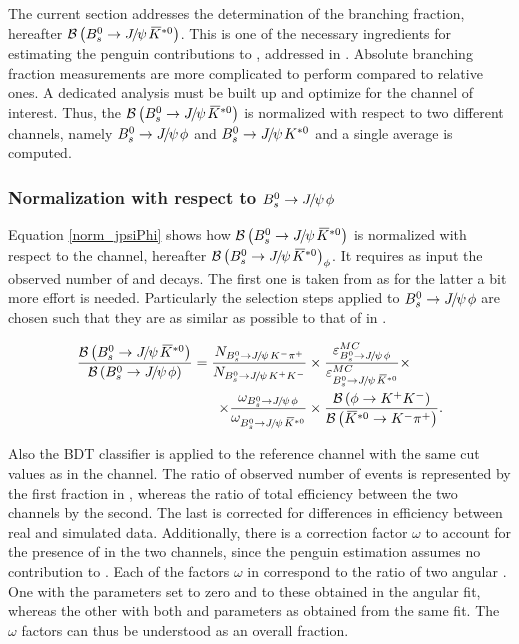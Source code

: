 
The current section addresses the determination of the \BsJpsiKst branching fraction, hereafter $\BRof\BsJpsiKst$.
This is one of the necessary ingredients for estimating the penguin contributions to \phis, addressed in .
Absolute branching fraction measurements are more complicated to perform compared to relative ones. A dedicated analysis
must be built up and optimize for the channel of interest. Thus, the $\BRof\BsJpsiKst$ is normalized with respect
to two different channels, namely $\BsJpsiPhi$ and $\BdJpsiKst$ and a single average is computed.

\subsubsection{Normalization with respect to $\BsJpsiPhi$}
Equation \ref{norm_jpsiPhi} shows how $\BRof\BsJpsiKst$ is normalized with respect to the \BsJpsiPhi channel, hereafter $\BRof{\BsJpsiKst}_\phi$.
It requires as input the observed number of \BsJpsiKst and \BsJpsiPhi decays. The first one is taken from  as for
the latter a bit more effort is needed. Particularly the selection steps applied to $\BsJpsiPhi$
are chosen such that they are as similar as possible to that of \BsJpsiKst in .

\begin{align}
  \centering
\frac{\BRof\BsJpsiKst}{\BRof\BsJpsiPhi} = \frac{N_{\BsJpsiKpi}}{N_{\BsJpsiKK}}
                                  &\times \frac{\varepsilon_{\BsJpsiPhi}^{MC}}{\varepsilon_{\BsJpsiKst}^{MC}}
                                   \times \nonumber \\
                                  \times \frac{\omega_{\BsJpsiPhi}}{\omega_{\BsJpsiKst}}
                                  & \times \frac{\BRof{\phi\to\kaon^+\kaon^-}}{\BRof{\Kstarzb\to\kaon^-\pion^+}}.
\label{norm_jpsiPhi}
\end{align}

\noindent Also the BDT classifier is applied to the reference channel
with the same cut values as in the \BsJpsiKst channel. The ratio of observed number of events is represented by the first fraction in ,
whereas the ratio of total efficiency between the two channels by the second. The last is corrected for differences in efficiency between real and
simulated data. Additionally, there is a correction factor $\omega$ to account for the presence of \swave in the two
channels, since the penguin estimation assumes no \swave contribution to \BsJpsiKst. Each of the factors $\omega$ in
 correspond to the ratio of two angular \pdfs. One with the \swave parameters set to zero and
\pwave to these obtained in the angular fit,  whereas the other with both \pwave and \swave parameters as obtained
from the same fit. The $\omega$ factors can thus be understood as an overall \swave fraction.

